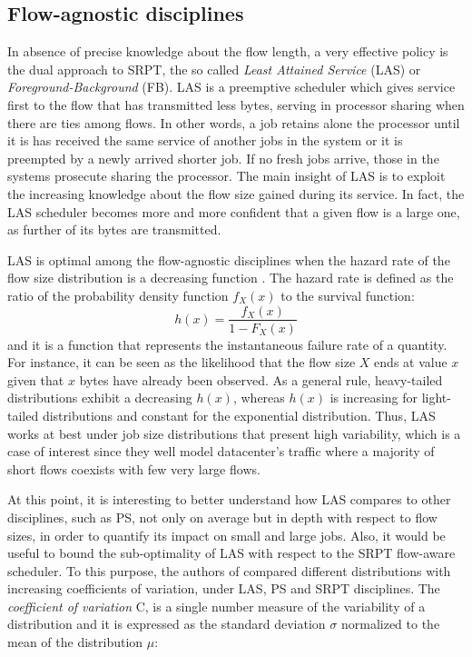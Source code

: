 \subsection{Flow-agnostic disciplines}
\label{sec:las}
In absence of precise knowledge about the flow length, a very effective policy is the dual approach to SRPT, the so called \emph{Least Attained Service} (LAS) or \emph{Foreground-Background} (FB). LAS is a preemptive scheduler which gives service first to the flow that has transmitted less bytes, serving in processor sharing when there are ties among flows. In other words, a job retains alone the processor until it is has received the same service of another jobs in the system or it is preempted by a newly arrived shorter job. If no fresh jobs arrive, those in the systems prosecute sharing the processor. The main insight of LAS is to exploit the increasing knowledge about the flow size gained during its service. In fact, the LAS scheduler becomes more and more confident that a given flow is a large one, as further of its bytes are transmitted. 

LAS is optimal among the flow-agnostic disciplines when the hazard rate of the flow size distribution is a  decreasing function \cite{Gittins}. The hazard rate is defined as the ratio of the probability density function $f_X(x)$ to the survival function:
\[
	h(x) = \dfrac{f_X(x)}{1-F_X(x)}
\]  and it is a function that represents the instantaneous failure rate of a quantity. For instance, it can be seen as the likelihood that the flow size $X$ ends at value $x$ given that $x$ bytes have already been observed. As a general rule, heavy-tailed distributions exhibit a decreasing $h(x)$, whereas $h(x)$ is increasing for light-tailed distributions and constant for the exponential distribution. Thus, LAS works at best under job size distributions that present high variability, which is a case of interest since they well model datacenter's traffic where a majority of short flows coexists with few very large flows. 

At this point, it is interesting to better understand how LAS compares to other disciplines, such as PS, not only on average but in depth with respect to flow sizes, in order to quantify its impact on small and large jobs. Also, it would be useful to bound the sub-optimality of LAS with respect to the SRPT flow-aware scheduler.  To this purpose, the authors of \cite{LAS_analysis} compared different distributions with increasing coefficients of variation, under LAS, PS and SRPT disciplines.  The \emph{coefficient of variation} C, is a single number measure of the variability of a distribution and it is expressed as the standard deviation $\sigma$ normalized to the mean of the distribution $\mu$: 

